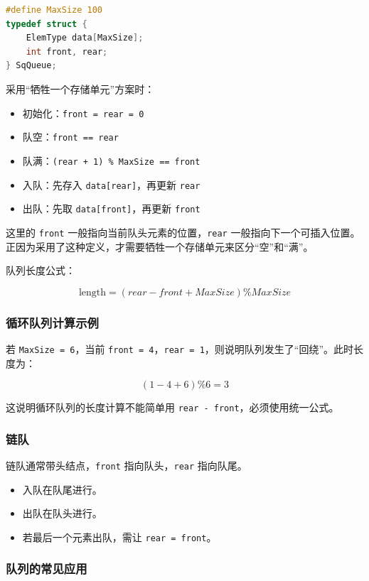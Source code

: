 \documentclass{../../note}
\begin{document}
\begin{lstlisting}[language=C]
#define MaxSize 100
typedef struct {
    ElemType data[MaxSize];
    int front, rear;
} SqQueue;
\end{lstlisting}

采用“牺牲一个存储单元”方案时：

\begin{itemize}
  \item 初始化：\texttt{front = rear = 0}
  \item 队空：\texttt{front == rear}
  \item 队满：\texttt{(rear + 1) \% MaxSize == front}
  \item 入队：先存入 \texttt{data[rear]}，再更新 \texttt{rear}
  \item 出队：先取 \texttt{data[front]}，再更新 \texttt{front}
\end{itemize}

这里的 \texttt{front} 一般指向当前队头元素的位置，\texttt{rear} 一般指向下一个可插入位置。正因为采用了这种定义，才需要牺牲一个存储单元来区分“空”和“满”。

队列长度公式：

\[
\text{length} = (rear - front + MaxSize) \% MaxSize
\]

\subsubsection{循环队列计算示例}

若 \texttt{MaxSize = 6}，当前 \texttt{front = 4}，\texttt{rear = 1}，则说明队列发生了“回绕”。此时长度为：

\[
(1 - 4 + 6) \% 6 = 3
\]

这说明循环队列的长度计算不能简单用 \texttt{rear - front}，必须使用统一公式。

\subsubsection{链队}

链队通常带头结点，\texttt{front} 指向队头，\texttt{rear} 指向队尾。

\begin{itemize}
  \item 入队在队尾进行。
  \item 出队在队头进行。
  \item 若最后一个元素出队，需让 \texttt{rear = front}。
\end{itemize}

\subsubsection{队列的常见应用}
\end{document}
